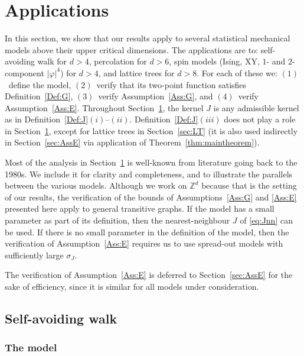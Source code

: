\documentclass[11pt,a4paper]{article}
\numberwithin{equation}{section}
\theoremstyle{plain}
\theoremstyle{definition}
\newcommand\1{\mathds{1}}
\begin{document}
\section{Applications}
\label{sec:applications}


In this section,
we show that our results apply to several statistical mechanical
models above their upper critical dimensions.
The applications are to: self-avoiding walk
for $d>4$, percolation for $d>6$, spin models (Ising, XY, $1$- and $2$-component $|\varphi|^4$)
for $d>4$, and lattice trees for $d>8$.
For each of these we: $(1)$~define the model,
$(2)$~verify that its two-point function satisfies Definition~\ref{Def:G},
$(3)$~verify Assumption~\ref{Ass:G}, and $(4)$~verify Assumption~\ref{Ass:E}.
Throughout Section~\ref{sec:applications}, the kernel $J$ is any admissible kernel as in Definition~\ref{Def:J}$(i)$--$(ii)$.
Definition~\ref{Def:J}$(iii)$ does not play a role in Section~\ref{sec:applications}, except for lattice trees in Section~\ref{sec:LT} (it is also used indirectly in Section~\ref{sec:AssE}
via application of Theorem~\ref{thm:maintheorem}).

Most of the analysis in Section~\ref{sec:applications} is well-known from literature going back to the
1980s.  We include it for clarity and completeness, and to illustrate
the parallels between the various models.
Although we work on $\mathbb Z^d$ because that is the setting of our
results, the verification of the bounds of Assumptions~\ref{Ass:G} and \ref{Ass:E} presented here apply to general transitive graphs. If the model has a small parameter as part of its definition, then
the nearest-neighbour $J$ of \eqref{eq:Jnn} can be used.
If there is no small parameter in the definition of the model, then the verification
of Assumption~\ref{Ass:E} requires us to use spread-out models with sufficiently large $\sigma_J$.

The verification of Assumption~\ref{Ass:E} is deferred to Section~\ref{sec:AssE}
for the sake of efficiency, since it is similar for all models under
consideration.


\subsection{Self-avoiding walk}
\label{sec:SAW}


\subsubsection{The model}
\label{sec:SAWmodel}
\end{document}
